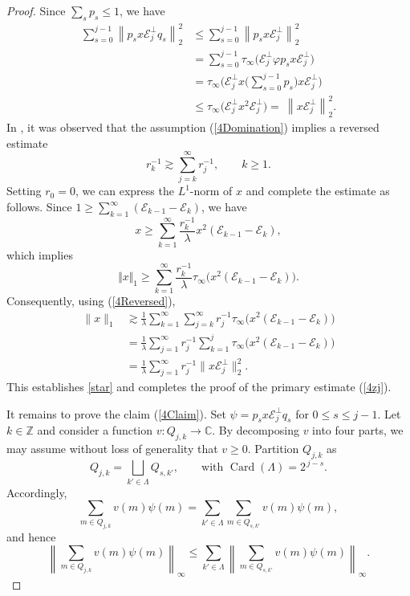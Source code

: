 \documentclass[12pt]{amsart}
\newcommand{\E}{\mbox{${\mathcal E}$}}
\newcommand{\norm}[1]{\Vert#1\Vert}
\theoremstyle{remark}
\theoremstyle{definition}
\numberwithin{equation}{section}
\begin{document}
\begin{proof}
Since $\sum_s p_s\leq 1$, we have
\begin{align*}
\sum_{s=0}^{j-1} \left\|p_s x\mathcal{E}_j^\perp q_s\right\|_2^2 
& \le \sum_{s=0}^{j-1} \left\|p_sx\mathcal{E}_j^\perp\right\|_2^2\\
& =\sum_{s=0}^{j-1}\tau_\infty\bigl(\mathcal{E}_j^\perp
\varphi p_sx\mathcal{E}_j^\perp\bigr) \\
& = \tau_\infty\biggl(\mathcal{E}_j^\perp
x\biggl(\sum_{s=0}^{j-1}p_s\biggr) 
x\mathcal{E}_j^\perp\biggr)\\
& \leq \tau_\infty\bigl(\mathcal{E}_j^\perp
x^2\mathcal{E}_j^\perp\bigr) = \
\left\|x\mathcal{E}_j^\perp\right\|_2^2.
\end{align*}
In \cite[End of Section 3]{LaV},
it was observed that the assumption (\ref{4Domination}) implies a 
reversed estimate
\begin{equation}\label{4Reversed}
r_k^{-1}\gtrsim \sum_{j=k}^\infty r_{j}^{-1},\qquad  k\geq 1.
\end{equation}
Setting $r_0=0$, we can express the $L^1$-norm of $x$ and 
complete the estimate as follows. Since 
$1\geq \sum_{k=1}^\infty (\E_{k-1} -\E_k)$, we have 
$$
x\geq \sum_{k=1}^{\infty}\frac{r_{k}^{-1}}{\lambda}
x^2(\E_{k-1} -\E_k),
$$
which implies
$$
\norm{x}_1\geq \sum_{k=1}^{\infty}\frac{r_{k}^{-1}}{\lambda}
\tau_\infty\bigl(x^2(\E_{k-1} -\E_k)\bigr).
$$
Consequently, using (\ref{4Reversed}),
\begin{align*}
\| x\|_1 
&\gtrsim\frac{1}{\lambda} \sum_{k=1}^{\infty} \sum_{j=k}^{\infty} r_j^{-1} \tau_\infty\bigl(x^2(\E_{k-1} -\E_k)\bigr) \\
& =\frac{1}{\lambda} \sum_{j=1}^{\infty} r_j^{-1} \sum_{k=1}^{j} \tau_\infty\bigl(x^2(\E_{k-1} -\E_k)\bigr)\\
& = \frac{1}{\lambda} \sum_{j=1}^{\infty} r_j^{-1} 
\| x\mathcal{E}_j^\perp\|_2^2.
\end{align*}
This establishes \eqref{star} and completes the proof of the primary estimate
(\ref{4zj}).




It remains to prove the claim (\ref{4Claim}).
Set $\psi = p_s x\mathcal{E}_j^\perp q_s$ for $0\le s\le j-1$. 
Let $k\in\mathbb Z$ and consider a function $v:Q_{j,k}\longrightarrow \mathbb C$. 
By decomposing $v$ into four parts, we may assume without 
loss of generality that $v\ge 0$. Partition $Q_{j,k}$ as
\[
Q_{j,k} = \bigsqcup_{k'\in\Lambda} Q_{s,k'}, \qquad \text{with } \operatorname{Card}(\Lambda)=2^{\,j-s}.
\]
Accordingly,
\[
\sum_{m\in Q_{j,k}} v(m)\psi(m) = 
\sum_{k'\in\Lambda} \sum_{m\in Q_{s,k'}} v(m)\psi(m),
\]
and hence
\[
\left\| \sum_{m\in Q_{j,k}} v(m)\psi(m) \right\|_\infty 
\le \sum_{k'\in\Lambda} \left\| \sum_{m\in Q_{s,k'}} v(m)
\psi(m) \right\|_\infty.
\]


\end{proof}
\end{document}
